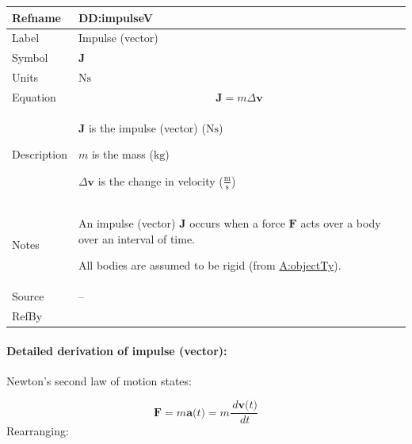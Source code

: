 \documentclass[12pt]{article}
\begin{document}
\medskip
\noindent
\begin{minipage}{\textwidth}
\begin{tabular}{>{\raggedright}p{}>{\raggedright\arraybackslash}p{}}
\toprule \textbf{Refname} & \textbf{DD:impulseV}
\label{DD:impulseV}
\\ \midrule
Label & Impulse (vector)
        
\\ \midrule
Symbol & $\symbf{J}$
         
\\ \midrule
Units & $\text{N}\text{s}$
        
\\ \midrule
Equation & \begin{displaymath}
           \symbf{J}=m Δ\symbf{v}
           \end{displaymath}
\\ \midrule
Description & \begin{symbDescription}
              \item{$\symbf{J}$ is the impulse (vector) ($\text{N}\text{s}$)}
              \item{$m$ is the mass (${\text{kg}}$)}
              \item{$Δ\symbf{v}$ is the change in velocity ($\frac{\text{m}}{\text{s}}$)}
              \end{symbDescription}
\\ \midrule
Notes & An impulse (vector) $\symbf{J}$ occurs when a force $\symbf{F}$ acts over a body over an interval of time.
        
        All bodies are assumed to be rigid (from \hyperref[assumpOT]{A:objectTy}).
        
\\ \midrule
Source & --
         
\\ \midrule
RefBy & 
\\ \bottomrule
\end{tabular}
\end{minipage}

\paragraph{Detailed derivation of impulse (vector):}
\label{DD:impulseVDeriv}
Newton's second law of motion states:

\begin{displaymath}
\symbf{F}=m \symbf{a}\text{(}t\text{)}=m \frac{\,d\symbf{v}\text{(}t\text{)}}{\,dt}
\end{displaymath}
Rearranging:
\end{document}
